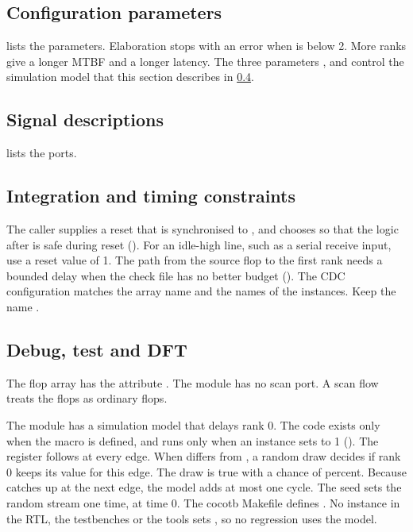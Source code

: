 \subsection{Configuration parameters}
 lists the parameters. Elaboration stops with an error when  is below 2. More ranks give a longer MTBF and a longer latency. The three parameters ,  and  control the simulation model that this section describes in \cref{tm:mod:cdc-sync:debug}.



\subsection{Signal descriptions}
 lists the ports.



\subsection{Integration and timing constraints}
The caller supplies a reset that is synchronised to , and chooses  so that the logic after  is safe during reset (). For an idle-high line, such as a serial receive input, use a reset value of 1. The path from the source flop to the first rank needs a bounded delay when the check file has no better budget (). The CDC configuration matches the array name  and the names of the instances. Keep the name .

\subsection{Debug, test and DFT}\label{tm:mod:cdc-sync:debug}
The flop array has the attribute . The module has no scan port. A scan flow treats the flops as ordinary flops.

The module has a simulation model that delays rank 0. The code exists only when the macro  is defined, and runs only when an instance sets  to 1 (). The register  follows  at every edge. When  differs from , a random draw decides if rank 0 keeps its value for this edge. The draw is true with a chance of  percent. Because  catches up at the next edge, the model adds at most one cycle. The seed  sets the random stream one time, at time 0. The cocotb Makefile defines . No instance in the RTL, the testbenches or the tools sets , so no regression uses the model.

